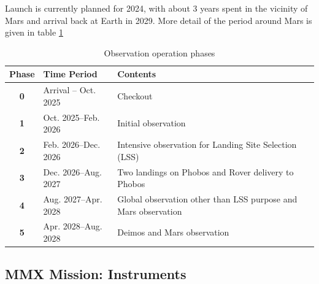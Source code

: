 Launch is currently planned for 2024, with about 3 years spent in the vicinity of Mars and arrival back at Earth in 2029. More detail of the period around Mars is given in table \ref{table:phases}

\begin{table}[hbt!]
	\centering %
	\caption{Observation operation phases}
	\label{table:phases}
	\small
	\begin{tabular}{|c|l|l|}
		\hline
		\textbf{Phase} & \textbf{Time Period} & \textbf{Contents} \\
		\hline
		\textbf{0}	& Arrival – Oct. 2025 & Checkout \\
		\textbf{1} & Oct. 2025–Feb. 2026 & Initial observation \\
		\textbf{2} & Feb. 2026–Dec. 2026 & Intensive observation for Landing Site Selection (LSS) \\
		\textbf{3} & Dec. 2026–Aug. 2027 & Two landings on Phobos and Rover delivery to Phobos \\
		\textbf{4} & Aug. 2027–Apr. 2028 & Global observation other than LSS purpose and Mars observation \\
		\textbf{5} & Apr. 2028–Aug. 2028 & Deimos and Mars observation \\
		\hline
	\end{tabular}
\end{table}



\subsection{MMX Mission: Instruments}\label{section:instruments}

